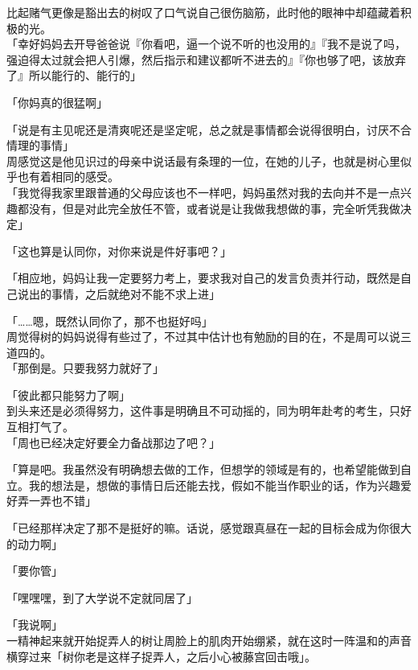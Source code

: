 比起赌气更像是豁出去的树叹了口气说自己很伤脑筋，此时他的眼神中却蕴藏着积极的光。\\

「幸好妈妈去开导爸爸说『你看吧，逼一个说不听的也没用的』『我不是说了吗，强迫得太过就会把人引爆，然后指示和建议都听不进去的』『你也够了吧，该放弃了』所以能行的、能行的」

「你妈真的很猛啊」

「说是有主见呢还是清爽呢还是坚定呢，总之就是事情都会说得很明白，讨厌不合情理的事情」\\

周感觉这是他见识过的母亲中说话最有条理的一位，在她的儿子，也就是树心里似乎也有着相同的感受。\\

「我觉得我家里跟普通的父母应该也不一样吧，妈妈虽然对我的去向并不是一点兴趣都没有，但是对此完全放任不管，或者说是让我做我想做的事，完全听凭我做决定」

「这也算是认同你，对你来说是件好事吧？」

「相应地，妈妈让我一定要努力考上，要求我对自己的发言负责并行动，既然是自己说出的事情，之后就绝对不能不求上进」

「……嗯，既然认同你了，那不也挺好吗」\\

周觉得树的妈妈说得有些过了，不过其中估计也有勉励的目的在，不是周可以说三道四的。\\

「那倒是。只要我努力就好了」

「彼此都只能努力了啊」\\

到头来还是必须得努力，这件事是明确且不可动摇的，同为明年赴考的考生，只好互相打气了。\\

「周也已经决定好要全力备战那边了吧？」

「算是吧。我虽然没有明确想去做的工作，但想学的领域是有的，也希望能做到自立。我的想法是，想做的事情日后还能去找，假如不能当作职业的话，作为兴趣爱好弄一弄也不错」

「已经那样决定了那不是挺好的嘛。话说，感觉跟真昼在一起的目标会成为你很大的动力啊」

「要你管」

「嘿嘿嘿，到了大学说不定就同居了」

「我说啊」\\

一精神起来就开始捉弄人的树让周脸上的肌肉开始绷紧，就在这时一阵温和的声音横穿过来「树你老是这样子捉弄人，之后小心被藤宫回击哦」。\\


